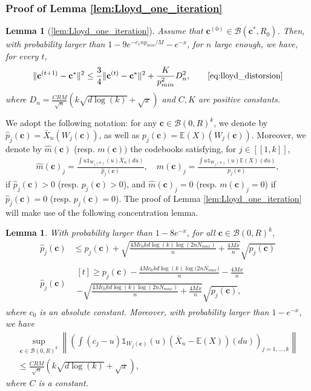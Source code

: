 \documentclass[noinfoline,preprint]{article}
\newtheorem{lem}[theorem]{Lemma}
\newtheorem*{lem*}{Lemma}
\newcommand{\cb}{\mathbf{c}}
\newcommand{\E}{\mathbb{E}}
\renewcommand{\1}{\mathds 1}
\newcommand{\B}{\mathcal{B}}
\begin{document}
\subsubsection{Proof of Lemma \ref{lem:Lloyd_one_iteration}}
\label{sec:proof_lemma_Lloyd_one_iteration}
\begin{lem*}[\ref{lem:Lloyd_one_iteration}]
Assume that $\cb^{(0)} \in \B(\cb^*,R_0)$. Then, with probability larger than $1-9e^{ -c_1 n p_{min}/M} - e^{-x}$, for $n$ large enough, we have, for every $t$,
\begin{align*}
\|\cb^{(t+1)} - \cb^*\|^2 \leq \frac{3}{4} \|\cb^{(t)} - \cb^*\|^2 + \frac{K}{p_{min}^2} D_n^2, \qquad \mbox{\eqref{eq:lloyd_distorsion}} 
\end{align*}
where $D_n = \frac{C R M}{\sqrt{n}}  \left (k \sqrt{d\log(k)}+ \sqrt{x} \right )$ and $C,K$ are positive constants.
\end{lem*}
We adopt the following notation: for any $\cb \in \B(0,R)^k$, we denote by $\hat{p}_j(\cb) = \bar{X}_n(W_j(\cb))$, as well as $p_j(\cb) = \E(X)(W_j(\cb))$. Moreover, we denote by $\hat{m}(\cb)$ (resp. $m(\cb))$ the codebooks satisfying, for $j \in [\![1, k]\!]$, 
\begin{align*}
\hat{m}(\cb)_j  = \frac{ \int  u \1_{W_j(\cb)}(u)\bar{X}_n(du)}{\hat{p}_j(\cb)}, \quad 
m(\cb)_j  = \frac{ \int u \1_{W_j(\cb)}(u) \E(X)(du)}{p_j(\cb)},
\end{align*}
if $\hat{p}_j(\cb)>0$ (resp. $p_j(\cb) >0$), and $\hat{m}(\cb)_j = 0$ (resp. $m(\cb)_j=0$) if $\hat{p}_j(\cb)=0$ (resp. $p_j(\cb)=0$). The proof of Lemma \ref{lem:Lloyd_one_iteration} will make use of the following concentration lemma.
\begin{lem}\label{lem:concentration_Lloyd}
With probability larger than $1-8e^{-x}$, for all $\cb \in \B(0,R)^k$, 
\begin{align*}
\hat{p}_j(\cb) & \leq p_j(\cb) + \sqrt{\frac{4Mc_0kd \log(k)  \log( 2 n N_{max})}{n} + \frac{4Mx}{n}}\sqrt{p_j(\cb)} \\
\hat{p}_j(\cb) & \begin{multlined}[t]\geq p_j(\cb) - \frac{4M c_0 kd \log(k) \log({2nN_{max})}}{n} - \frac{4Mx}{n} \\ - \sqrt{\frac{4Mc_0kd \log(k) \log({2nN_{max}})}{n} + \frac{4Mx}{n}}\sqrt{p_j(\cb)},
\end{multlined} 
\end{align*}
where $c_0$ is an absolute constant. Moreover, with probability larger than $1-e^{-x}$, we have
\begin{multline*}
\sup_{\cb \in \B(0,R)^k} \left \| \left (    \int   (c_j-u)\1_{W_j(\cb)}(u) (\bar{X}_n - \mathbb{E}(X))(du)  \right )_{j=1, \hdots, k}  \right \| \\ 
\leq \frac{C R M}{\sqrt{n}}  \left (k \sqrt{d\log(k)}+ \sqrt{x} \right ), 
\end{multline*}
where $C$ is a constant.
\end{lem}
\end{document}

